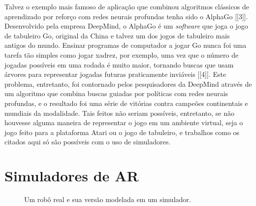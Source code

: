 \documentclass[cic,tc]{iiufrgs}
\begin{document}
Talvez o exemplo mais famoso de aplicação que combinou algoritmos clássicos de
aprendizado por reforço com redes neurais profundas tenha sido o AlphaGo [[3]].
Desenvolvido pela empresa DeepMind, o AlphaGo é um \textit{software} que joga o
jogo de tabuleiro Go, original da China e talvez um dos jogos de tabuleiro mais
antigos do mundo. Ensinar programas de computador a jogar Go nunca foi uma
tarefa tão simples como jogar xadrez, por exemplo, uma vez que o número de
jogadas possíveis em uma rodada é muito maior, tornando buscas que usam árvores
para representar jogadas futuras praticamente inviáveis [[4]]. Este problema,
entretanto, foi contornado pelos pesquisadores da DeepMind através de um
algoritmo que combina buscas guiadas por políticas com redes neurais profundas,
e o resultado foi uma série de vitórias contra campeões continentais e mundiais
da modalidade. Tais feitos não seriam possíveis, entretanto, se não houvesse
alguma maneira de representar o jogo em um ambiente virtual, seja o jogo feito
para a plataforma Atari ou o jogo de tabuleiro, e trabalhos como os citados aqui
só são possíveis com o uso de simuladores.



\section{Simuladores de AR}


\begin{figure}[h]
    \caption{Um robô real e sua versão modelada em um simulador.}
    \begin{center}
    \end{center}
    \label{fig:mujocosimulator}
\end{figure}
\end{document}
